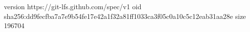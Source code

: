 version https://git-lfs.github.com/spec/v1
oid sha256:dd9fecfba7a7e9b54fe17e42a1f32a81ff1033ca3f05c0a10c5c12eab31aa28e
size 196704
